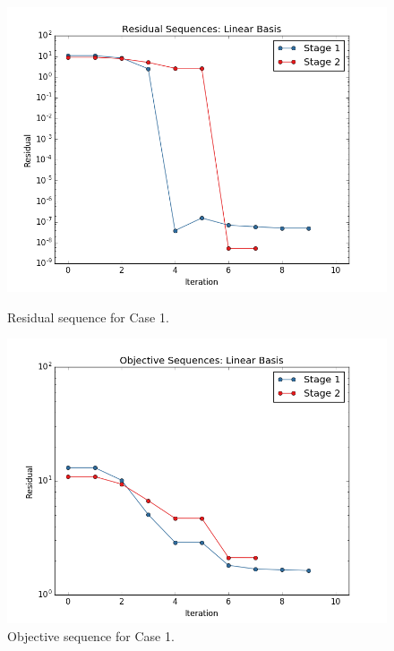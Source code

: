 \documentclass[]{aiaa-tc}%
\begin{document}
\begin{figure}[!ht]
\centering
\begin{minipage}{.50\textwidth}
 \centering
 \includegraphics[width=.8\textwidth]{../images/residual_case1}
 \caption{Residual sequence for Case 1.}
 \label{fig:residual_case1}
\end{minipage}%
\begin{minipage}{.50\textwidth}
 \centering
 \includegraphics[width=.8\textwidth]{../images/objective_case1}
 \caption{Objective sequence for Case 1.}
 \label{fig:objective_case1}
\end{minipage}
\end{figure}
\end{document}
